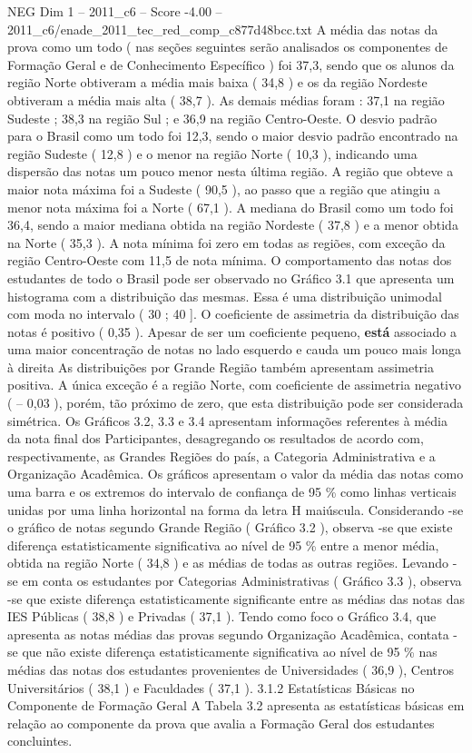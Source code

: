 \begin{textsample}{NEG Dim 1 – 2011\_c6 – Score -4.00 – 2011\_c6/enade\_2011\_tec\_red\_comp\_c877d48bcc.txt}
A média das notas da prova como um todo ( nas seções seguintes serão analisados os componentes de Formação Geral e de Conhecimento Específico ) foi 37,3, sendo que os alunos da região Norte obtiveram a média mais baixa ( 34,8 ) e os da região Nordeste obtiveram a média mais alta ( 38,7 ).
As demais médias foram : 37,1 na região Sudeste ; 38,3 na região Sul ; e 36,9 na região Centro-Oeste.
O desvio padrão para o Brasil como um todo foi 12,3, sendo o maior desvio padrão encontrado na região Sudeste ( 12,8 ) e o menor na região Norte ( 10,3 ), indicando uma dispersão das notas um pouco menor nesta última região.
A região que obteve a maior nota máxima foi a Sudeste ( 90,5 ), ao passo que a região que atingiu a menor nota máxima foi a Norte ( 67,1 ).
A mediana do Brasil como um todo foi 36,4, sendo a maior mediana obtida na região Nordeste ( 37,8 ) e a menor obtida na Norte ( 35,3 ).
A nota mínima foi zero em todas as regiões, com exceção da região Centro-Oeste com 11,5 de nota mínima.
O comportamento das notas dos estudantes de todo o Brasil pode ser observado no Gráfico 3.1 que apresenta um histograma com a distribuição das mesmas.
Essa é uma distribuição unimodal com moda no intervalo ( 30 ; 40 ].
O coeficiente de assimetria da distribuição das notas é positivo ( 0,35 ).
Apesar de ser um coeficiente pequeno, \textbf{está} associado a uma maior concentração de notas no lado esquerdo e cauda um pouco mais longa à direita As distribuições por Grande Região também apresentam assimetria positiva.
A única exceção é a região Norte, com coeficiente de assimetria negativo ( – 0,03 ), porém, tão próximo de zero, que esta distribuição pode ser considerada simétrica.
Os Gráficos 3.2, 3.3 e 3.4 apresentam informações referentes à média da nota final dos Participantes, desagregando os resultados de acordo com, respectivamente, as Grandes Regiões do país, a Categoria Administrativa e a Organização Acadêmica.
Os gráficos apresentam o valor da média das notas como uma barra e os extremos do intervalo de confiança de 95 \% como linhas verticais unidas por uma linha horizontal na forma da letra H maiúscula.
Considerando -se o gráfico de notas segundo Grande Região ( Gráfico 3.2 ), observa -se que existe diferença estatisticamente significativa ao nível de 95 \% entre a menor média, obtida na região Norte ( 34,8 ) e as médias de todas as outras regiões.
Levando -se em conta os estudantes por Categorias Administrativas ( Gráfico 3.3 ), observa -se que existe diferença estatisticamente significante entre as médias das notas das IES Públicas ( 38,8 ) e Privadas ( 37,1 ).
Tendo como foco o Gráfico 3.4, que apresenta as notas médias das provas segundo Organização Acadêmica, contata -se que não existe diferença estatisticamente significativa ao nível de 95 \% nas médias das notas dos estudantes provenientes de Universidades ( 36,9 ), Centros Universitários ( 38,1 ) e Faculdades ( 37,1 ). 3.1.2 Estatísticas Básicas no Componente de Formação Geral A Tabela 3.2 apresenta as estatísticas básicas em relação ao componente da prova que avalia a Formação Geral dos estudantes concluintes.

\end{textsample}
